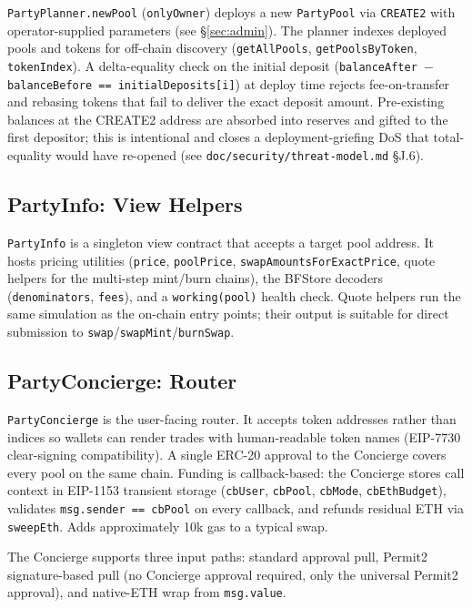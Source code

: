 \documentclass[11pt]{article}
\begin{document}
\texttt{PartyPlanner.newPool} (\texttt{onlyOwner}) deploys a new
\texttt{PartyPool} via \texttt{CREATE2} with operator-supplied parameters
(see \S\ref{sec:admin}). The planner indexes deployed pools and tokens for
off-chain discovery (\texttt{getAllPools}, \texttt{getPoolsByToken},
\texttt{tokenIndex}). A delta-equality check on the initial deposit
(\texttt{balanceAfter $-$ balanceBefore == initialDeposits[i]}) at deploy
time rejects fee-on-transfer and rebasing tokens that fail to deliver the
exact deposit amount. Pre-existing balances at the CREATE2 address are
absorbed into reserves and gifted to the first depositor; this is intentional
and closes a deployment-griefing DoS that total-equality would have re-opened
(see \texttt{doc/security/threat-model.md} \S J.6).

\subsection{PartyInfo: View Helpers}

\texttt{PartyInfo} is a singleton view contract that accepts a target pool
address. It hosts pricing utilities (\texttt{price}, \texttt{poolPrice},
\texttt{swapAmountsForExactPrice}, quote helpers for the multi-step mint/burn
chains), the BFStore decoders (\texttt{denominators}, \texttt{fees}), and a
\texttt{working(pool)} health check. Quote helpers run the same simulation
as the on-chain entry points; their output is suitable for direct submission
to \texttt{swap}/\texttt{swapMint}/\texttt{burnSwap}.

\subsection{PartyConcierge: Router}
\label{sec:concierge}

\texttt{PartyConcierge} is the user-facing router. It accepts token addresses
rather than indices so wallets can render trades with human-readable token
names (EIP-7730 clear-signing compatibility). A single ERC-20 approval to
the Concierge covers every pool on the same chain. Funding is callback-based:
the Concierge stores call context in EIP-1153 transient storage
(\texttt{cbUser}, \texttt{cbPool}, \texttt{cbMode}, \texttt{cbEthBudget}),
validates \texttt{msg.sender == cbPool} on every callback, and refunds
residual ETH via \texttt{sweepEth}. Adds approximately 10k gas to a typical
swap.

The Concierge supports three input paths: standard approval pull,
Permit2 signature-based pull (no Concierge approval required, only the
universal Permit2 approval), and native-ETH wrap from \texttt{msg.value}.
\end{document}
